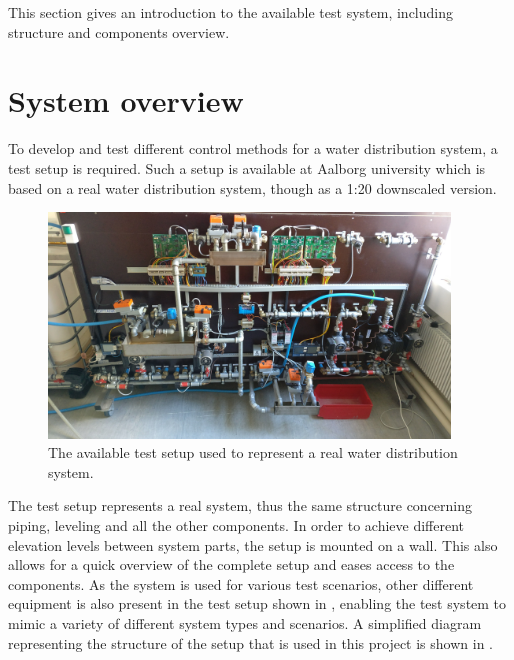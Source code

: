 This section gives an introduction to the available test system, including structure and components overview.  

\section{System overview}
\label{system_overview}
To develop and test different control methods for a water distribution system, a test setup is required.
Such a setup is available at Aalborg university which is based on a real water distribution system, though as a 1:20 downscaled version.

\begin{figure}[H]
\centering
\includegraphics[width=0.95\textwidth]{report/pictures/test_system_wide}
\caption{The available test setup used to represent a real water distribution system.}
\label{fig:test_setup}
\end{figure}


The test setup represents a real system, thus the same structure concerning piping, leveling and all the other components. In order to achieve different elevation levels between system parts, the setup is mounted on a wall. This also allows for a quick overview of the complete setup and eases access to the components. As the system is used for various test scenarios, other different equipment is also present in the test setup shown in , enabling the test system to mimic a variety of different system types and scenarios. A simplified diagram representing the structure of the setup that is used in this project is shown in . 

